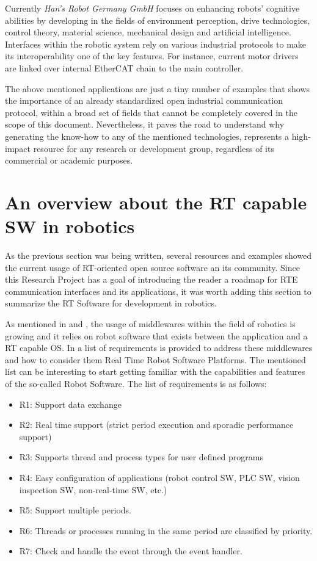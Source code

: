 Currently \emph{Han's Robot Germany GmbH} focuses on enhancing robots’ cognitive abilities by developing in the fields of environment perception, drive technologies, 
control theory, material science, mechanical design and artificial intelligence. Interfaces within the robotic system rely on various
industrial protocols to make its interoperability one of the key features. For instance, current motor drivers
are linked over internal EtherCAT chain to the main controller\cite{hans_homepage}.

The above mentioned applications are just a tiny number of examples that shows the importance of an already standardized open industrial communication protocol, 
within a broad set of fields that cannot be completely covered in the scope of this document. Nevertheless, it paves the road to understand why generating the know-how 
to any of the mentioned technologies, represents a high-impact resource for any research or development group, regardless of its commercial or academic purposes.

\section{An overview about the RT capable SW in robotics}

As the previous section was being written, several resources and examples showed the current usage of RT-oriented
open source software an its community. Since this Research Project has a goal of introducing the reader a roadmap for RTE communication interfaces and 
its applications, it was worth adding this section to summarize the RT Software for development in robotics.

As mentioned in \cite{ecat_xenomai} and \cite{ecat_motionplanning},%
the usage of middlewares within the field of robotics is growing and it relies on robot software that exists between the application and a RT capable OS.
In \cite{middleware_industrial} %
a list of requirements is provided to address these middlewares and how to consider them Real Time Robot Software Platforms. The mentioned list can be interesting
to start getting familiar with the capabilities and features of the so-called Robot Software. The list of requirements is as follows: 
\begin{itemize}
    \item R1: Support data exchange
    \item R2: Real time support (strict period execution and sporadic performance support)
    \item R3: Supports thread and process types for user defined programs
    \item R4: Easy configuration of applications (robot control SW, PLC SW, vision inspection SW, non-real-time SW, etc.)
    \item R5: Support multiple periods.
    \item R6: Threads or processes running in the same period are classified by priority.
    \item R7: Check and handle the event through the event handler.
\end{itemize}

